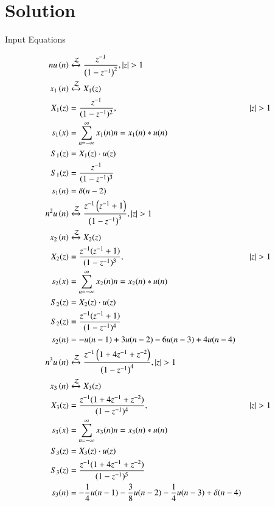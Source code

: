 \documentclass[journal,12pt,onecolumn]{IEEEtran}
\theoremstyle{remark}
\begin{document}
\section*{Solution}
\begin{table}[h]
  \centering
  
  \caption{Input Equations}
  \label{tab:input-equations}
\end{table}
\begin{align}
    n u\left(n\right) &\xleftrightarrow{\mathcal{Z}} \frac{z^{-1}}{\left(1-z^{-1}\right)^2} ,   \left\vert z\right\vert >1 \\
    x_1\left(n\right) &\xleftrightarrow{\mathcal{Z}}X_1(z)\\
    X_1(z) &= \frac{z^{-1}}{(1-z^{-1})^2}, &|z| > 1 \\
    s_1(x) &= \sum_{n=-\infty}^{\infty} x_1(n)n=x_1(n)* u(n)\\
    S_1(z) &= X_1(z) \cdot u(z) \\
    S_1(z) &= \frac{z^{-1}}{(1-z^{-1})^3} \\
    s_1(n) &= \delta(n-2)\\ 
    n^2 u\left(n\right) &\xleftrightarrow{\mathcal{Z}} \frac{z^{-1}\left(z^{-1}+1\right)}{\left(1-z^{-1}\right)^3} ,  \left\vert z\right\vert > 1\\
    x_2\left(n\right) &\xleftrightarrow{\mathcal{Z}}X_2(z)\\
    X_2(z) &= \frac{z^{-1}(z^{-1}+1)}{(1-z^{-1})^3}, &|z| > 1 \\
    s_2(x) &= \sum_{n=-\infty}^{\infty} x_2(n)n=x_2(n)* u(n)\\
    S_2(z) &= X_2(z) \cdot u(z) \\
    S_2(z) &= \frac{z^{-1}(z^{-1}+1)}{(1-z^{-1})^4} \\ 
    s_2(n) &= -u(n-1) + 3u(n-2) - 6u(n-3) + 4u(n-4)\\
    n^3 u\left(n\right) &\xleftrightarrow{\mathcal{Z}} \frac{z^{-1}\left(1+4z^{-1}+z^{-2}\right)}{\left(1-z^{-1}\right)^4} ,   \left\vert z\right\vert >1 \\ 
    x_3\left(n\right) &\xleftrightarrow{\mathcal{Z}}X_3(z)\\
    X_3(z) &= \frac{z^{-1}(1+4z^{-1}+z^{-2})}{(1-z^{-1})^4}, &|z| > 1 \\
    s_3(x) &= \sum_{n=-\infty}^{\infty} x_3(n)n=x_3(n)* u(n)\\
    S_3(z) &= X_3(z) \cdot u(z) \\
    S_3(z) &= \frac{z^{-1}(1+4z^{-1}+z^{-2})}{(1-z^{-1})^5}\\
    s_3(n) &= -\frac{1}{4}u(n-1) -\frac{3}{8}u(n-2) -\frac{1}{4}u(n-3) + \delta(n-4) 
\end{align} 
\end{document}
